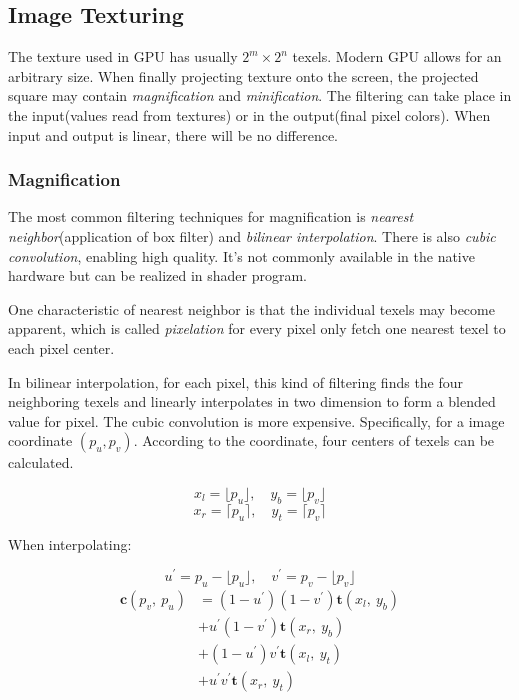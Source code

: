 \documentclass[10pt, a4paper]{article}
\begin{document}
\subsection{Image Texturing}
The texture used in GPU has usually $2^m \times 2^n$ texels. Modern GPU allows for an arbitrary size. When finally projecting texture onto the screen, the projected square may contain \emph{magnification} and \emph{minification}. The filtering can take place in the input(values read from  textures) or in the output(final pixel colors). When input and output is linear, there will be no difference. 

\subsubsection{Magnification}
    The most common filtering techniques for magnification is \emph{nearest neighbor}(application of box filter) and \emph{bilinear interpolation}. There is also \emph{cubic convolution}, enabling high quality. It's not commonly available in the native hardware but can be realized in shader program. 
    
    One characteristic of nearest neighbor is that the individual texels may become apparent, which is called \emph{pixelation} for every pixel only fetch one nearest texel to each pixel center. 

    In bilinear interpolation, for each pixel, this kind of filtering finds the four neighboring texels and linearly interpolates in two dimension to form a blended value for pixel. The cubic convolution is more expensive.  Specifically, for a image coordinate $(p_u, p_v)$. According to the coordinate, four centers of texels can be calculated.

    $$x_l = \lfloor p_u \rfloor, \quad y_b = \lfloor p_v \rfloor$$
    $$x_r = \lceil p_u \rceil, \quad y_t = \lceil  p_v \rceil$$

    When interpolating:

    $$u^{'} = p_u - \lfloor p_u \rfloor,\quad v^{'} = p_v - \lfloor p_v \rfloor$$
    \begin{align*}
        \textbf{c}(p_v,\ p_u) &= (1 - u^{'})(1 - v^{'})\textbf{t}(x_l,\ y_b) \\
            &+ u^{'}(1 - v^{'})\textbf{t}(x_r,\ y_b) \\
            &+ (1 - u^{'})v^{'}\textbf{t}(x_l,\ y_t) \\
            &+ u^{'}v^{'}\textbf{t}(x_r,\ y_t)
    \end{align*}
\end{document}
